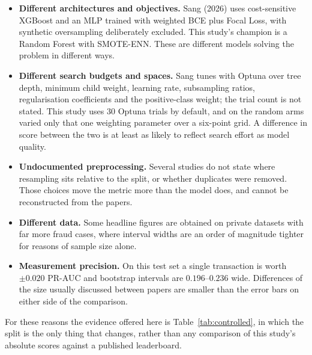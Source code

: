 \documentclass[11pt,a4paper]{article}
\begin{document}
\begin{itemize}[itemsep=3pt]
      \item \textbf{Different architectures and objectives.} Sang (2026) uses cost-sensitive
            XGBoost and an MLP trained with weighted BCE plus Focal Loss, with synthetic
            oversampling deliberately excluded. This study's champion is a Random Forest with
            SMOTE-ENN. These are different models solving the problem in different ways.
      \item \textbf{Different search budgets and spaces.} Sang tunes with Optuna over tree depth,
            minimum child weight, learning rate, subsampling ratios, regularisation coefficients
            and the positive-class weight; the trial count is not stated. This study uses 30
            Optuna trials by default, and on the random arms varied only that one weighting
            parameter over a six-point grid. A difference in score between the two is at least as
            likely to reflect search effort as model quality.
      \item \textbf{Undocumented preprocessing.} Several studies do not state where resampling
            sits relative to the split, or whether duplicates were removed. Those choices move
            the metric more than the model does, and cannot be reconstructed from the papers.
      \item \textbf{Different data.} Some headline figures are obtained on private datasets with
            far more fraud cases, where interval widths are an order of magnitude tighter for
            reasons of sample size alone.
      \item \textbf{Measurement precision.} On this test set a single transaction is worth
            $\pm0.020$ PR-AUC and bootstrap intervals are $0.196$--$0.236$ wide. Differences of
            the size usually discussed between papers are smaller than the error bars on either
            side of the comparison.
\end{itemize}

\noindent For these reasons the evidence offered here is Table~\ref{tab:controlled}, in which
the split is the only thing that changes, rather than any comparison of this study's absolute
scores against a published leaderboard.
\end{document}
